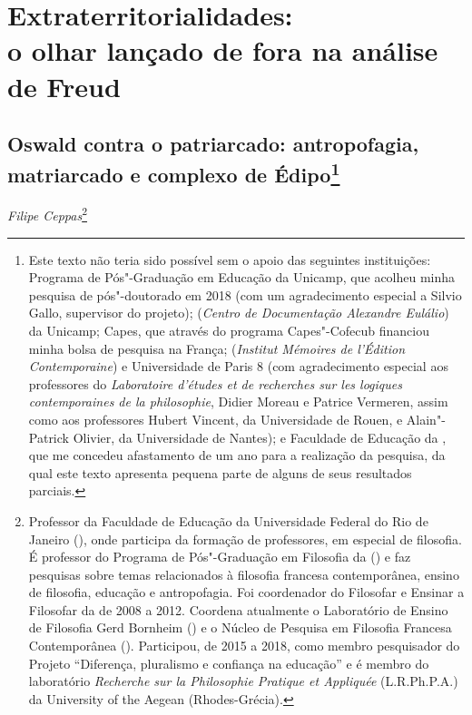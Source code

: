\part{Extraterritorialidades:\\ o olhar lançado de fora na análise de Freud}

\chapter*{Oswald contra o patriarcado: antropofagia, matriarcado e
complexo de Édipo\footnote{Este texto não teria sido possível sem o
  apoio das seguintes instituições: Programa de Pós"-Graduação em
  Educação da Unicamp, que acolheu minha pesquisa de pós"-doutorado em
  2018 (com um agradecimento especial a Silvio Gallo, supervisor do
  projeto);  (\emph{Centro de Documentação Alexandre Eulálio}) da
  Unicamp; Capes, que através do programa Capes"-Cofecub financiou minha
  bolsa de pesquisa na França;  (\emph{Institut Mémoires de
  l'Édition Contemporaine}) e Universidade de Paris 8 (com agradecimento
  especial aos professores do \emph{Laboratoire d'études et de
  recherches sur les logiques contemporaines de la philosophie}, Didier
  Moreau e Patrice Vermeren, assim como aos professores Hubert Vincent,
  da Universidade de Rouen, e Alain"-Patrick Olivier, da Universidade de
  Nantes); e Faculdade de Educação da , que me concedeu afastamento
  de um ano para a realização da pesquisa, da qual este texto apresenta
  pequena parte de alguns de seus resultados parciais.}}

\begin{flushright}
\emph{Filipe Ceppas}\footnote{Professor da Faculdade de Educação da Universidade Federal do
Rio de Janeiro (), onde participa da formação de professores, em especial
de filosofia. É professor do Programa de Pós"-Graduação em Filosofia da 
() e faz pesquisas sobre temas relacionados à filosofia francesa
contemporânea, ensino de filosofia, educação e antropofagia. Foi coordenador
do  Filosofar e Ensinar a Filosofar da  de 2008 a 2012. Coordena
atualmente o Laboratório de Ensino de Filosofia Gerd Bornheim () e o Núcleo de Pesquisa em Filosofia Francesa Contemporânea (). Participou, de 2015 a 2018, como membro pesquisador do Projeto  ``Diferença, pluralismo e confiança na educação'' e é membro do laboratório \emph{Recherche sur la Philosophie Pratique et Appliquée} (L.R.Ph.P.A.) da University of the Aegean (Rhodes-Grécia).}
\end{flushright}

